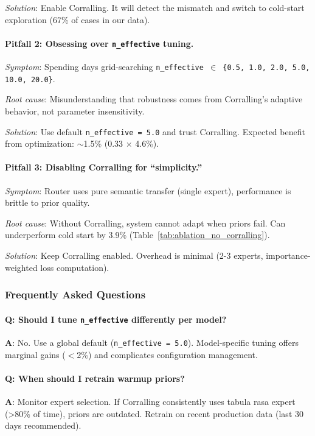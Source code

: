 \textit{Solution}: Enable Corralling. It will detect the mismatch and switch to cold-start exploration (67\% of cases in our data).

\paragraph{Pitfall 2: Obsessing over \texttt{n\_effective} tuning.}
\textit{Symptom}: Spending days grid-searching \texttt{n\_effective $\in$ \{0.5, 1.0, 2.0, 5.0, 10.0, 20.0\}}.

\textit{Root cause}: Misunderstanding that robustness comes from Corralling's adaptive behavior, not parameter insensitivity.

\textit{Solution}: Use default \texttt{n\_effective = 5.0} and trust Corralling. Expected benefit from optimization: $\sim$1.5\% (0.33 $\times$ 4.6\%).

\paragraph{Pitfall 3: Disabling Corralling for ``simplicity.''}
\textit{Symptom}: Router uses pure semantic transfer (single expert), performance is brittle to prior quality.

\textit{Root cause}: Without Corralling, system cannot adapt when priors fail. Can underperform cold start by 3.9\% (Table~\ref{tab:ablation_no_corralling}).

\textit{Solution}: Keep Corralling enabled. Overhead is minimal (2-3 experts, importance-weighted loss computation).


\subsubsection{Frequently Asked Questions}

\paragraph{Q: Should I tune \texttt{n\_effective} differently per model?}
\textbf{A}: No. Use a global default (\texttt{n\_effective = 5.0}). Model-specific tuning offers marginal gains ($<$2\%) and complicates configuration management.

\paragraph{Q: When should I retrain warmup priors?}
\textbf{A}: Monitor expert selection. If Corralling consistently uses tabula rasa expert (>80\% of time), priors are outdated. Retrain on recent production data (last 30 days recommended).

